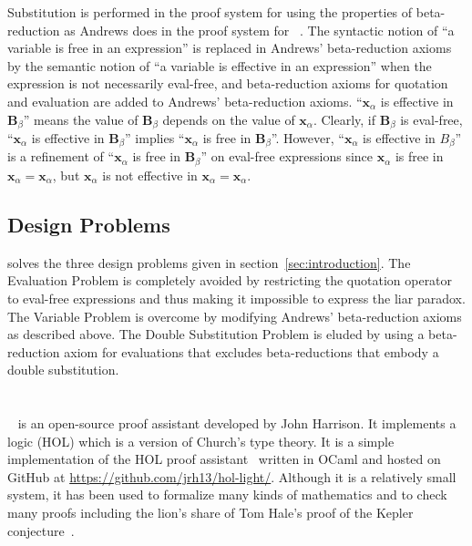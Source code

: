 \documentclass[fleqn]{llncs}
\begin{document}
Substitution is performed in the proof system for {\churchqe} using
the properties of beta-reduction as Andrews does in the proof system
for {\qzero}~\cite[p.~213]{Andrews02}.  The syntactic notion of ``a
variable is free in an expression'' is replaced in Andrews'
beta-reduction axioms by the semantic notion of ``a variable is
effective in an expression'' when the expression is not necessarily
eval-free, and beta-reduction axioms for quotation and evaluation are
added to Andrews' beta-reduction axioms.  ``$\textbf{x}_\alpha$ is
effective in $\textbf{B}_\beta$'' means the value of
$\textbf{B}_\beta$ depends on the value of $\textbf{x}_\alpha$.
Clearly, if $\textbf{B}_\beta$ is eval-free, ``$\textbf{x}_\alpha$ is
effective in $\textbf{B}_\beta$'' implies ``$\textbf{x}_\alpha$ is
free in $\textbf{B}_\beta$''.  However, ``$\textbf{x}_\alpha$ is
effective in ${B}_\beta$'' is a refinement of ``$\textbf{x}_\alpha$ is
free in $\textbf{B}_\beta$'' on eval-free expressions since
$\textbf{x}_\alpha$ is free in $\textbf{x}_\alpha =
\textbf{x}_\alpha$, but $\textbf{x}_\alpha$ is not effective in
$\textbf{x}_\alpha = \textbf{x}_\alpha$.

\subsection{Design Problems} 

{\churchqe} solves the three design problems given in
section~\ref{sec:introduction}.  The Evaluation Problem is completely
avoided by restricting the quotation operator to eval-free expressions
and thus making it impossible to express the liar paradox.  The
Variable Problem is overcome by modifying Andrews' beta-reduction
axioms as described above.  The Double Substitution Problem is eluded
by using a beta-reduction axiom for evaluations that excludes
beta-reductions that embody a double substitution.

\section{\HL}\label{sec:hol-light}

\HL~\cite{Harrison09} is an open-source proof assistant developed by
John Harrison.  It implements a logic (HOL) which is a version of
Church's type theory.  It is a simple implementation of the HOL proof
assistant~\cite{GordonMelham93} written in OCaml and hosted on GitHub
at \url{https://github.com/jrh13/hol-light/}.  Although it is a
relatively small system, it has been used to formalize many kinds of
mathematics and to check many proofs including the lion's share of Tom
Hale's proof of the Kepler conjecture~\cite{HalesEtAl17}.
\end{document}

